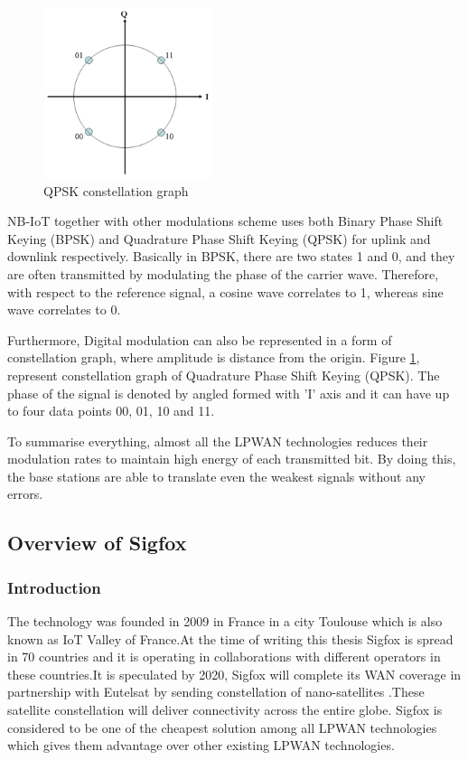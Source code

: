 \documentclass[12pt]{article}
\begin{document}
  \begin{figure}[H]
      \centering
      \includegraphics[width=0.5 \columnwidth, height=5cm, keepaspectratio
      ]{Images/QPSK.pdf}
      \caption{QPSK constellation graph}
      \label{fig:QPSK constellation graph}
  \end{figure}
  NB-IoT together with other modulations scheme uses both Binary Phase Shift Keying (BPSK) and Quadrature Phase Shift Keying (QPSK) for uplink and downlink respectively. Basically in BPSK, there are two states 1 and 0, and they are often transmitted by modulating the phase of the carrier wave. Therefore, with respect to the reference  signal, a cosine wave correlates to 1, whereas sine wave correlates to 0.
  
   Furthermore, Digital modulation can also be represented in a form of constellation graph, where amplitude is distance from the origin. Figure \ref{fig:QPSK constellation graph}, represent constellation graph of Quadrature Phase Shift Keying (QPSK). The phase of the signal is denoted by angled formed with 'I' axis and it can have up to four data points 00, 01, 10 and 11.

 To summarise everything, almost all the LPWAN technologies reduces their modulation rates to maintain high energy of each transmitted bit. By doing this, the base stations are able to translate even the weakest signals without any errors.


   



\subsection{Overview of Sigfox}
\subsubsection{Introduction}
The technology was founded in 2009 in France in a city Toulouse which is also known as IoT Valley of France.At the time of writing this thesis Sigfox is spread in 70 countries \cite{SigfoxCoverage} and it is operating in collaborations with different operators in these countries.It is speculated by 2020, Sigfox will complete its WAN coverage in partnership with Eutelsat by sending constellation of nano-satellites \cite{SigfoxSatellite}.These satellite constellation will deliver connectivity across the entire globe.
Sigfox is considered to be one of the cheapest solution among all LPWAN technologies \cite{hernandez2017energy} which gives them advantage over other existing LPWAN technologies. 
\end{document}
